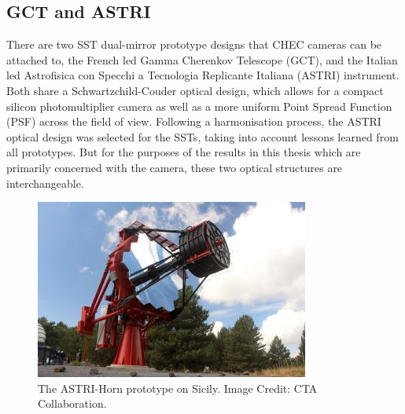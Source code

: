 \subsection{GCT and ASTRI}

There are two SST dual-mirror prototype designs that CHEC cameras can be attached to, the French led Gamma Cherenkov Telescope (GCT), and the Italian led Astrofisica con Specchi a Tecnologia Replicante Italiana (ASTRI) instrument. Both share a Schwartzchild-Couder optical design, which allows for a compact silicon photomultiplier camera as well as a more uniform Point Spread Function (PSF) across the field of view. Following a harmonisation process, the ASTRI optical design was selected for the SSTs, taking into account lessons learned from all prototypes. But for the purposes of the results in this thesis which are primarily concerned with the camera, these two optical structures are interchangeable.

\begin{figure}[ht] 
        \centering \includegraphics[width=\columnwidth]{figures/astri-horn.jpg}
        \caption{
                \label{fig:astri} %
                The ASTRI-Horn prototype on Sicily. Image Credit: CTA Collaboration.
        }
\end{figure}

